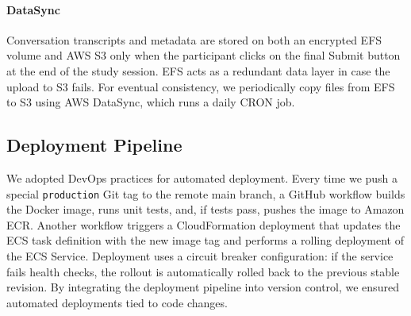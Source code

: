 \paragraph{DataSync} Conversation transcripts and metadata are stored on both an encrypted EFS volume and AWS S3 only when the participant clicks on the final Submit button at the end of the study session. EFS acts as a redundant data layer in case the upload to S3 fails. For eventual consistency, we periodically copy files from EFS to S3 using AWS DataSync, which runs a daily CRON job.

\subsection{Deployment Pipeline}
We adopted DevOps practices for automated deployment. Every time we push a special \texttt{production} Git tag to the remote main branch, a GitHub workflow builds the Docker image, runs unit tests, and, if tests pass, pushes the image to Amazon ECR. Another workflow triggers a CloudFormation deployment that updates the ECS task definition with the new image tag and performs a rolling deployment of the ECS Service. Deployment uses a circuit breaker configuration: if the service fails health checks, the rollout is automatically rolled back to the previous stable revision. By integrating the deployment pipeline into version control, we ensured automated deployments tied to code changes.
